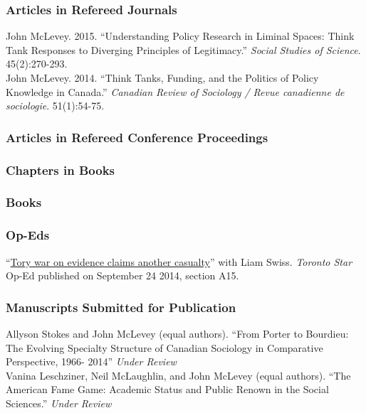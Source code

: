 \documentclass[9pt,usenames,dvipsnames]{article}
\begin{document}
\subsubsection*{Articles in Refereed Journals}

\ind John McLevey. 2015. ``Understanding Policy Research in Liminal Spaces: Think Tank Responses to Diverging Principles of Legitimacy.'' \emph{Social Studies of Science}. 45(2):270-293. \\

\ind John McLevey. 2014. ``Think Tanks, Funding, and the Politics of Policy Knowledge in Canada.'' \emph{Canadian Review of Sociology / Revue canadienne de sociologie}. 51(1):54-75.

\subsubsection*{Articles in Refereed Conference Proceedings}

\subsubsection*{Chapters in Books}

\subsubsection*{Books}

\subsubsection*{Op-Eds}

\ind ``\href{http://bit.ly/1ohSn1N}{Tory war on evidence claims another casualty}'' with Liam Swiss. \emph{Toronto Star} Op-Ed published on September 24 2014, section A15. 

\subsubsection*{Manuscripts Submitted for Publication}

\ind Allyson Stokes and John McLevey (equal authors). ``From Porter to Bourdieu: The Evolving Specialty Structure of Canadian Sociology in Comparative Perspective, 1966- 2014'' \emph{Under Review} \\

\ind Vanina Leschziner, Neil McLaughlin, and John McLevey (equal authors). ``The American Fame Game: Academic Status and Public Renown in the Social Sciences.'' \emph{Under Review} \\ 
\end{document}
